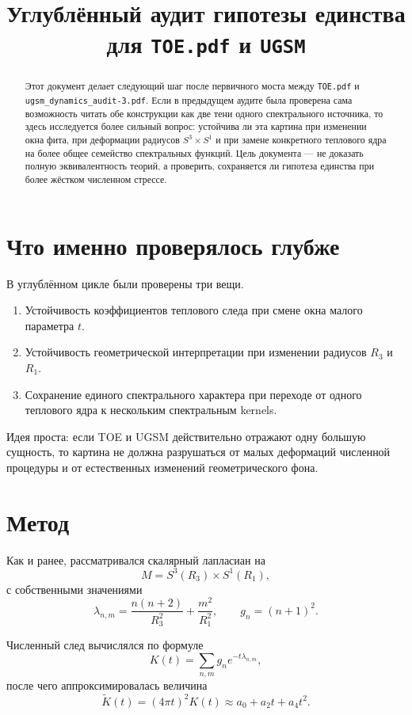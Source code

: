 \documentclass[12pt,a4paper]{article}
\title{Углублённый аудит гипотезы единства для \texttt{TOE.pdf} и \texttt{UGSM}}
\author{}
\date{}
\begin{document}
\maketitle

\begin{abstract}
Этот документ делает следующий шаг после первичного моста между \texttt{TOE.pdf} и \texttt{ugsm\_dynamics\_audit-3.pdf}. Если в предыдущем аудите была проверена сама возможность читать обе конструкции как две тени одного спектрального источника, то здесь исследуется более сильный вопрос: устойчива ли эта картина при изменении окна фита, при деформации радиусов \(S^3\times S^1\) и при замене конкретного теплового ядра на более общее семейство спектральных функций. Цель документа --- не доказать полную эквивалентность теорий, а проверить, сохраняется ли гипотеза единства при более жёстком численном стрессе.
\end{abstract}

\section{Что именно проверялось глубже}

В углублённом цикле были проверены три вещи.
\begin{enumerate}
    \item Устойчивость коэффициентов теплового следа при смене окна малого параметра \(t\).
    \item Устойчивость геометрической интерпретации при изменении радиусов \(R_3\) и \(R_1\).
    \item Сохранение единого спектрального характера при переходе от одного теплового ядра к нескольким спектральным kernels.
\end{enumerate}

Идея проста: если TOE и UGSM действительно отражают одну большую сущность, то картина не должна разрушаться от малых деформаций численной процедуры и от естественных изменений геометрического фона.

\section{Метод}

Как и ранее, рассматривался скалярный лапласиан на
\[
M=S^3(R_3)\times S^1(R_1),
\]
с собственными значениями
\[
\lambda_{n,m}=\frac{n(n+2)}{R_3^2}+\frac{m^2}{R_1^2},
\qquad g_n=(n+1)^2.
\]

Численный след вычислялся по формуле
\[
K(t)=\sum_{n,m} g_n e^{-t\lambda_{n,m}},
\]
после чего аппроксимировалась величина
\[
\widetilde K(t)=(4\pi t)^2 K(t) \approx a_0+a_2 t+a_4 t^2.
\]
\end{document}

